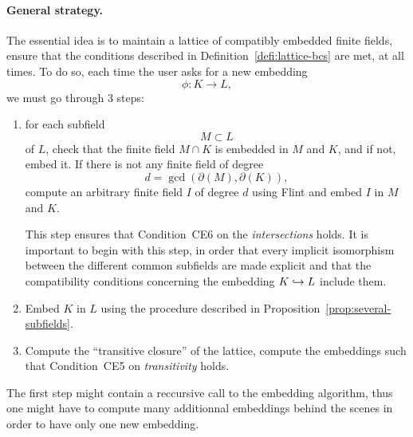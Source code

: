 \paragraph{General strategy.} The essential idea is to maintain a lattice of
compatibly embedded finite fields, \ie ensure that the conditions described in
Definition~\ref{defi:lattice-bcs} are met, at all
times. To do so, each time the user asks for a new embedding
\[
  \phi:K\to L,
\]
we must go through $3$ steps:
\begin{enumerate}
  \item for each subfield 
    \[
      M\subset L
    \]
    of $L$, check that the finite field $M\cap K$ is 
    embedded in $M$ and $K$, and if not, embed it. If there is not
    any finite field of degree 
    \[
      d=\gcd(\partial(M), \partial (K)),
  \]
    compute an
    arbitrary finite field $I$ of degree $d$ using Flint
    and embed $I$ in $M$ and $K$.
    \begin{center}
    \end{center}
    This step ensures that Condition~CE6 on the
    \emph{intersections} holds. It is important to begin with this step, in
    order 
    that every implicit isomorphism between the different common subfields are
    made explicit and that the compatibility conditions concerning the
    embedding $K\hookrightarrow L$ include them.
  \item Embed $K$ in $L$ using the procedure described in
    Proposition~\ref{prop:several-subfields}.
  \item Compute the ``transitive closure'' of the lattice, \ie compute the
    embeddings such that Condition~CE5 on \emph{transitivity} holds. 
\end{enumerate}
The first step might contain a reccursive call to the embedding algorithm, thus
one might have to compute many additionnal embeddings behind the scenes in order
to have only one new embedding. 
%

